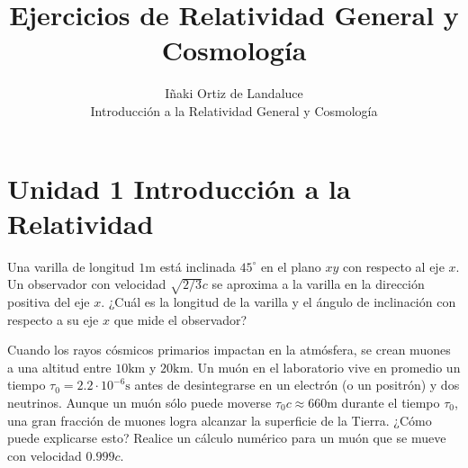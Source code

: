 \documentclass[12pt]{article}
\newenvironment{exercise}[2][Ejercicio]{\begin{trivlist} %
\item[\hskip \labelsep {\bfseries #1}\hskip \labelsep {\bfseries #2.}]}{\end{trivlist}}
\begin{document}
 
 
\title{Ejercicios de Relatividad General y Cosmología}
\author{Iñaki Ortiz de Landaluce\\ %
Introducción a la Relatividad General y Cosmología}

\maketitle

\section*{Unidad 1 Introducción a la Relatividad}
 
\begin{exercise}{1.1} Una varilla de longitud $1 \text{m}$ está inclinada $45^\circ$ en el plano $xy$ con respecto al eje $x$. Un observador con velocidad $\sqrt{2/3}c$ se aproxima a la varilla en la dirección positiva del eje $x$. ¿Cuál es la longitud de la varilla y el ángulo de inclinación con respecto a su eje $x$ que mide el observador?
\end{exercise}

\begin{exercise}{1.2} Cuando los rayos cósmicos primarios impactan en la atmósfera, se crean muones a una altitud entre $10 \text{km}$ y $20 \text{km}$. Un muón en el laboratorio vive en promedio un tiempo $\tau_0 = 2.2 \cdot 10^{-6} \text{s}$ antes de desintegrarse en un electrón (o un positrón) y dos neutrinos. Aunque un muón sólo puede moverse $\tau_0 c \approx 660 \text{m}$ durante el tiempo $\tau_0$, una gran fracción de muones logra alcanzar la superficie de la Tierra. ¿Cómo puede explicarse esto? Realice un cálculo numérico para un muón que se mueve con velocidad $0.999c$.
\end{exercise}


 
\end{document}
